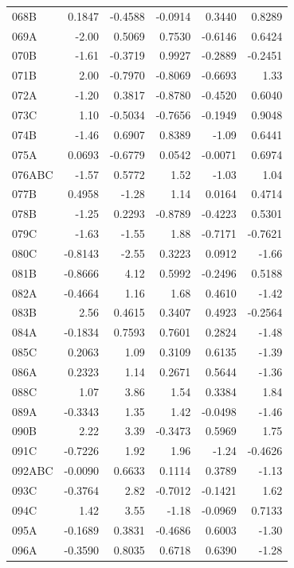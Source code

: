 \begin{longtable}{lrrrrr}
  068B & 0.1847 & -0.4588 & -0.0914 & 0.3440 & 0.8289 \\
  069A & -2.00 & 0.5069 & 0.7530 & -0.6146 & 0.6424 \\
  070B & -1.61 & -0.3719 & 0.9927 & -0.2889 & -0.2451 \\
  071B & 2.00 & -0.7970 & -0.8069 & -0.6693 & 1.33 \\
  072A & -1.20 & 0.3817 & -0.8780 & -0.4520 & 0.6040 \\
  073C & 1.10 & -0.5034 & -0.7656 & -0.1949 & 0.9048 \\
  074B & -1.46 & 0.6907 & 0.8389 & -1.09 & 0.6441 \\
  075A & 0.0693 & -0.6779 & 0.0542 & -0.0071 & 0.6974 \\
  076ABC & -1.57 & 0.5772 & 1.52 & -1.03 & 1.04 \\
  077B & 0.4958 & -1.28 & 1.14 & 0.0164 & 0.4714 \\
  078B & -1.25 & 0.2293 & -0.8789 & -0.4223 & 0.5301 \\
  079C & -1.63 & -1.55 & 1.88 & -0.7171 & -0.7621 \\
  080C & -0.8143 & -2.55 & 0.3223 & 0.0912 & -1.66 \\
  081B & -0.8666 & 4.12 & 0.5992 & -0.2496 & 0.5188 \\
  082A & -0.4664 & 1.16 & 1.68 & 0.4610 & -1.42 \\
  083B & 2.56 & 0.4615 & 0.3407 & 0.4923 & -0.2564 \\
  084A & -0.1834 & 0.7593 & 0.7601 & 0.2824 & -1.48 \\
  085C & 0.2063 & 1.09 & 0.3109 & 0.6135 & -1.39 \\
  086A & 0.2323 & 1.14 & 0.2671 & 0.5644 & -1.36 \\
  088C & 1.07 & 3.86 & 1.54 & 0.3384 & 1.84 \\
  089A & -0.3343 & 1.35 & 1.42 & -0.0498 & -1.46 \\
  090B & 2.22 & 3.39 & -0.3473 & 0.5969 & 1.75 \\
  091C & -0.7226 & 1.92 & 1.96 & -1.24 & -0.4626 \\
  092ABC & -0.0090 & 0.6633 & 0.1114 & 0.3789 & -1.13 \\
  093C & -0.3764 & 2.82 & -0.7012 & -0.1421 & 1.62 \\
  094C & 1.42 & 3.55 & -1.18 & -0.0969 & 0.7133 \\
  095A & -0.1689 & 0.3831 & -0.4686 & 0.6003 & -1.30 \\
  096A & -0.3590 & 0.8035 & 0.6718 & 0.6390 & -1.28 \\

\end{longtable}
